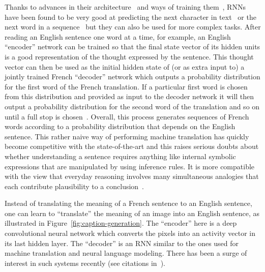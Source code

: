 \documentclass[10pts]{article}
\newcommand{\citep}[1]{\cite{#1}}
\newcommand{\citet}[1]{\cite{#1}}
\begin{document}
Thanks to advances in their architecture~\citep{Hochreiter+Schmidhuber-1997,ElHihi+Bengio-nips8-small} 
and ways of training them~\citep{Sutskever-thesis2012,Pascanu+al-ICML2013-small}, RNNs
have been found to be very good at predicting the next character in
text~\citep{Sutskever-et-al-ICML2011} or the next word in a
sequence~\citep{Mikolov-et-al-NIPS2013} but they can also be used for
more complex tasks.  After reading an English sentence one word at a
time, for example, an English ``encoder'' network can be trained so
that the final state vector of its hidden units is a good
representation of the thought expressed by the sentence.  This thought
vector can then be used as the initial hidden state of (or as extra
input to) a jointly trained French ``decoder'' network which outputs a
probability distribution for the first word of the French
translation. If a particular first word is chosen from this
distribution and provided as input to the decoder network it will then
output a probability distribution for the second word of the
translation and so on until a full stop is
chosen~\citep{Bahdanau-et-al-ICLR2015-small,Sutskever-et-al-NIPS2014}.
Overall, this process generates sequences of French words according to
a probability distribution that depends on the English sentence.
This rather naive way of performing machine translation has quickly become
competitive with the state-of-the-art and this raises serious doubts about
whether understanding a sentence requires anything like internal symbolic
expressions that are manipulated by using inference rules.
%
It is more compatible with
the view that everyday reasoning involves many simultaneous analogies that
each contribute plausibility to a 
conclusion~\citep{Lakoff+Johnson-2008,Rogers+McClelland-book2004}.

Instead of translating the meaning of a French sentence to an English sentence,
one can learn to ``translate'' the meaning of an image into an English sentence,
as illustrated in Figure~\ref{fig:caption-generation}. The ``encoder'' here is
a deep convolutional neural network which converts the pixels into an
activity vector in its last hidden layer. The ``decoder''
is an RNN similar to the ones used for machine translation
and neural language modeling. There has been a surge of interest in such
systems recently (see citations in~\citet{Xu-et-al-arxiv2015}).
\end{document}

